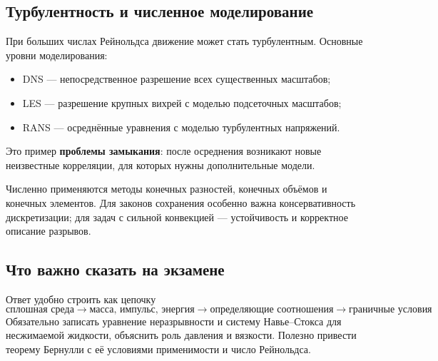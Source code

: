 \subsection{Турбулентность и численное моделирование}

При больших числах Рейнольдса движение может стать турбулентным. Основные
уровни моделирования:
\begin{itemize}
    \item DNS --- непосредственное разрешение всех существенных масштабов;
    \item LES --- разрешение крупных вихрей с моделью подсеточных масштабов;
    \item RANS --- осреднённые уравнения с моделью турбулентных напряжений.
\end{itemize}
Это пример \textbf{проблемы замыкания}: после осреднения возникают новые
неизвестные корреляции, для которых нужны дополнительные модели.

Численно применяются методы конечных разностей, конечных объёмов и конечных
элементов. Для законов сохранения особенно важна консервативность
дискретизации; для задач с сильной конвекцией --- устойчивость и корректное
описание разрывов.

\subsection{Что важно сказать на экзамене}

Ответ удобно строить как цепочку
\[
\boxed{
\text{сплошная среда}
\to
\text{масса, импульс, энергия}
\to
\text{определяющие соотношения}
\to
\text{граничные условия}
}.
\]
Обязательно записать уравнение неразрывности и систему Навье--Стокса для
несжимаемой жидкости, объяснить роль давления и вязкости. Полезно привести
теорему Бернулли с её условиями применимости и число Рейнольдса.

\newpage
